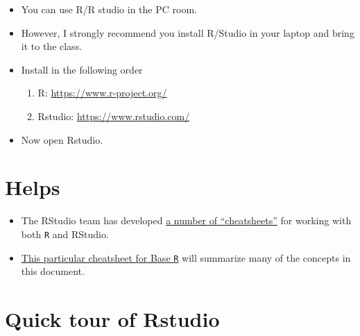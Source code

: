 \documentclass[]{book}
\providecommand{\tightlist}{%
  \setlength{\itemsep}{0pt}\setlength{\parskip}{0pt}}
\begin{document}
\begin{itemize}
\tightlist
\item
  You can use R/R studio in the PC room.
\item
  However, I strongly recommend you install R/Studio in your laptop and
  bring it to the class.
\item
  Install in the following order

  \begin{enumerate}
  \def\labelenumi{\arabic{enumi}.}
  \tightlist
  \item
    R: \url{https://www.r-project.org/}
  \item
    Rstudio: \url{https://www.rstudio.com/}
  \end{enumerate}
\item
  Now open Rstudio.
\end{itemize}

\section{Helps}\label{helps}

\begin{itemize}
\tightlist
\item
  The RStudio team has developed
  \href{https://www.rstudio.com/resources/cheatsheets/}{a number of
  ``cheatsheets''} for working with both \texttt{R} and RStudio.
\item
  \href{http://www.rstudio.com/wp-content/uploads/2016/05/base-r.pdf}{This
  particular cheatsheet for Base \texttt{R}} will summarize many of the
  concepts in this document.
\end{itemize}

\section{Quick tour of Rstudio}\label{quick-tour-of-rstudio}
\end{document}
